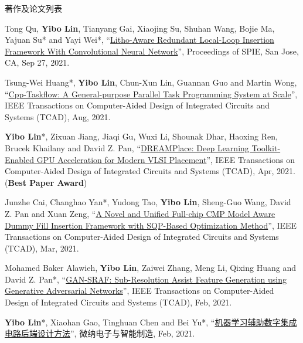 \begin{rSection}{著作及论文列表}
\begin{description}[font=\normalfont, rightmargin=2em]
{}
            

\item[{[C75]}]{
        Tong Qu, \textbf{Yibo Lin}, Tianyang Gai, Xiaojing Su, Shuhan Wang, Bojie Ma, Yajuan Su* and Yayi Wei*, 
    ``\href{https://doi.org/10.1117/12.2601685}{Litho-Aware Redundant Local-Loop Insertion Framework With Convolutional Neural Network}'', 
    Proceedings of SPIE, San Jose, CA, Sep 27, 2021.
    
}
            

\item[{[J74]}]{
        Tsung-Wei Huang*, \textbf{Yibo Lin}, Chun-Xun Lin, Guannan Guo and Martin Wong, 
    ``\href{https://doi.org/10.1109/TCAD.2020.3025075}{Cpp-Taskflow: A General-purpose Parallel Task Programming System at Scale}'', 
    IEEE Transactions on Computer-Aided Design of Integrated Circuits and Systems (TCAD), Aug, 2021.
    
}
            

\item[{[J73]}]{
        \textbf{Yibo Lin}*, Zixuan Jiang, Jiaqi Gu, Wuxi Li, Shounak Dhar, Haoxing Ren, Brucek Khailany and David Z. Pan, 
    ``\href{https://doi.org/10.1109/TCAD.2020.3003843}{DREAMPlace: Deep Learning Toolkit-Enabled GPU Acceleration for Modern VLSI Placement}'', 
    IEEE Transactions on Computer-Aided Design of Integrated Circuits and Systems (TCAD), Apr, 2021.
    (\textbf{Best Paper Award})
}
            

\item[{[J72]}]{
        Junzhe Cai, Changhao Yan*, Yudong Tao, \textbf{Yibo Lin}, Sheng-Guo Wang, David Z. Pan and Xuan Zeng, 
    ``\href{https://doi.org/10.1109/TCAD.2020.3001380}{A Novel and Unified Full-chip CMP Model Aware Dummy Fill Insertion Framework with SQP-Based Optimization Method}'', 
    IEEE Transactions on Computer-Aided Design of Integrated Circuits and Systems (TCAD), Mar, 2021.
    
}
            

\item[{[J71]}]{
        Mohamed Baker Alawieh, \textbf{Yibo Lin}, Zaiwei Zhang, Meng Li, Qixing Huang and David Z. Pan*, 
    ``\href{https://doi.org/10.1109/TCAD.2020.2995338}{GAN-SRAF: Sub-Resolution Assist Feature Generation using Generative Adversarial Networks}'', 
    IEEE Transactions on Computer-Aided Design of Integrated Circuits and Systems (TCAD), Feb, 2021.
    
}
            

\item[{[J70]}]{
        \textbf{Yibo Lin}*, Xiaohan Gao, Tinghuan Chen and Bei Yu*, 
    ``\href{https://doi.org/10.19816/j.cnki.10-1594/tn.2021.02.011}{机器学习辅助数字集成电路后端设计方法}'', 
    微纳电子与智能制造, Feb, 2021.
    
}
\end{description}
\end{rSection}
